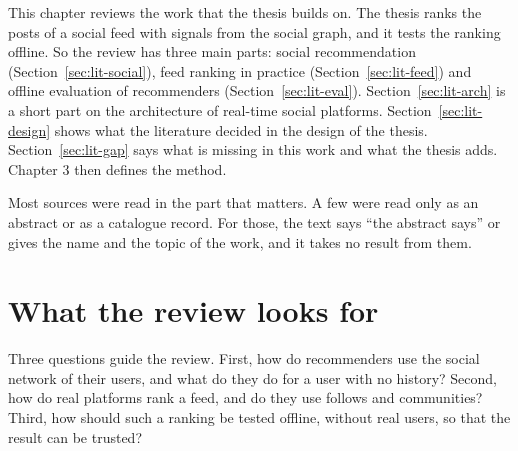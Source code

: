 
\label{ch:literature}

This chapter reviews the work that the thesis builds on. The thesis ranks the posts of a social feed with signals from the social graph, and it tests the ranking offline. So the review has three main parts: social recommendation (Section~\ref{sec:lit-social}), feed ranking in practice (Section~\ref{sec:lit-feed}) and offline evaluation of recommenders (Section~\ref{sec:lit-eval}). Section~\ref{sec:lit-arch} is a short part on the architecture of real-time social platforms. Section~\ref{sec:lit-design} shows what the literature decided in the design of the thesis. Section~\ref{sec:lit-gap} says what is missing in this work and what the thesis adds. Chapter 3 then defines the method.

Most sources were read in the part that matters. A few were read only as an abstract or as a catalogue record. For those, the text says ``the abstract says'' or gives the name and the topic of the work, and it takes no result from them.

\section{What the review looks for}
\label{sec:lit-questions}

Three questions guide the review. First, how do recommenders use the social network of their users, and what do they do for a user with no history? Second, how do real platforms rank a feed, and do they use follows and communities? Third, how should such a ranking be tested offline, without real users, so that the result can be trusted?

